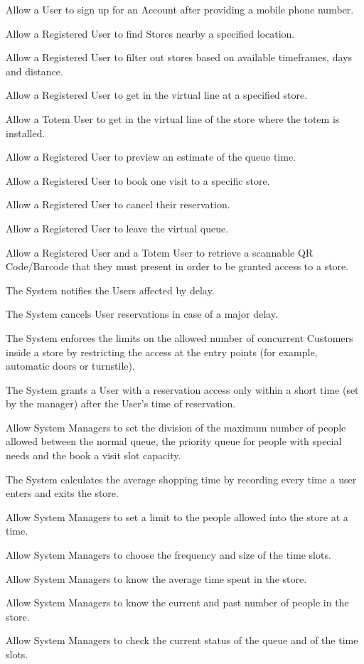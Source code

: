 \begin{enumerate}[label={[R\arabic*]}]
    \item Allow a User to sign up for an Account after providing a mobile phone number.
    \item Allow a Registered User to find Stores nearby a specified location.
    \item Allow a Registered User to filter out stores based on available timeframes, days and distance.   
    \item Allow a Registered User to get in the virtual line at a specified store.
    \item Allow a Totem User to get in the virtual line of the store where the totem is installed.
    \item Allow a Registered User to preview an estimate of the queue time.
    \item Allow a Registered User to book one visit to a specific store.
    \item Allow a Registered User to cancel their reservation.
    \item Allow a Registered User to leave the virtual queue.
    \item Allow a Registered User and a Totem User to retrieve a scannable QR Code/Barcode that they must present in order to be granted access to a store.

    \item The System notifies the Users affected by delay.
    \item The System cancels User reservations in case of a major delay.
    \item The System enforces the limits on the allowed number of concurrent Customers inside a store by restricting the access at the entry points (for example, automatic doors or turnstile).
    \item The System grants a User with a reservation access only within a short time (set by the manager) after the User's time of reservation.
    \item Allow System Managers to set the division of the maximum number of people allowed between the normal queue, the priority queue for people with special needs and the book a visit slot capacity.    
    \item The System calculates the average shopping time by recording every time a user enters and exits the store.
    
    \item Allow System Managers to set a limit to the people allowed into the store at a time.
    \item Allow System Managers to choose the frequency and size of the time slots.
    \item Allow System Managers to know the average time spent in the store.
    \item Allow System Managers to know the current and past number of people in the store.
    \item Allow System Managers to check the current status of the queue and of the time slots.
    
\end{enumerate}

